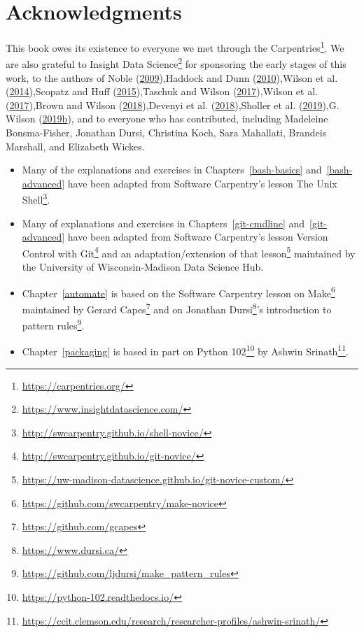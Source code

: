 \documentclass[
]{krantz}
\renewcommand{\href}[2]{#2\footnote{\url{#1}}}
\begin{document}
\hypertarget{intro-ack}{%
\section{Acknowledgments}\label{intro-ack}}

This book owes its existence to
everyone we met through \href{https://carpentries.org/}{the Carpentries}.
We are also grateful to \href{https://www.insightdatascience.com/}{Insight Data Science} for sponsoring the early stages of this work,
to the authors of Noble (\protect\hyperlink{ref-Nobl2009}{2009}),Haddock and Dunn (\protect\hyperlink{ref-Hadd2010}{2010}),Wilson et al. (\protect\hyperlink{ref-Wils2014}{2014}),Scopatz and Huff (\protect\hyperlink{ref-Scop2015}{2015}),Taschuk and Wilson (\protect\hyperlink{ref-Tasc2017}{2017}),Wilson et al. (\protect\hyperlink{ref-Wils2017}{2017}),Brown and Wilson (\protect\hyperlink{ref-Brow2018}{2018}),Devenyi et al. (\protect\hyperlink{ref-Deve2018}{2018}),Sholler et al. (\protect\hyperlink{ref-Shol2019}{2019}),G. Wilson (\protect\hyperlink{ref-Wils2019}{2019}\protect\hyperlink{ref-Wils2019}{b}),
and to everyone who has contributed, including Madeleine Bonsma-Fisher,
Jonathan Dursi,
Christina Koch,
Sara Mahallati,
Brandeis Marshall,
and Elizabeth Wickes.

\begin{itemize}
\item
  Many of the explanations and exercises in Chapters~\ref{bash-basics} and~\ref{bash-advanced}
  have been adapted from Software Carpentry's lesson
  \href{http://swcarpentry.github.io/shell-novice/}{The Unix Shell}.
\item
  Many of explanations and exercises in Chapters~\ref{git-cmdline} and~\ref{git-advanced}
  have been adapted from Software Carpentry's lesson
  \href{http://swcarpentry.github.io/git-novice/}{Version Control with Git} and an
  \href{https://uw-madison-datascience.github.io/git-novice-custom/}{adaptation/extension of that lesson} maintained by
  the University of Wisconsin-Madison Data Science Hub.
\item
  Chapter~\ref{automate} is based on the \href{https://github.com/swcarpentry/make-novice}{Software Carpentry lesson on Make}
  maintained by \href{https://github.com/gcapes}{Gerard Capes}
  and on \href{https://www.dursi.ca/}{Jonathan Dursi}'s
  \href{https://github.com/ljdursi/make_pattern_rules}{introduction to pattern rules}.
\item
  Chapter~\ref{packaging} is based in part on \href{https://python-102.readthedocs.io/}{Python 102}
  by \href{https://ccit.clemson.edu/research/researcher-profiles/ashwin-srinath/}{Ashwin Srinath}.
\end{itemize}
\end{document}

